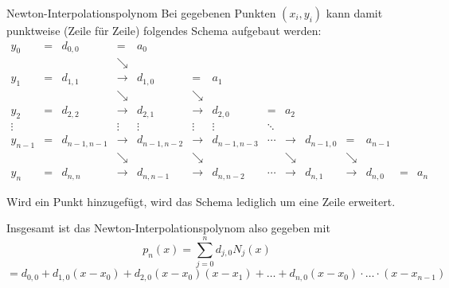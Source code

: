 \begin{defi}{Newton-Interpolationspolynom}
    Bei gegebenen Punkten $(x_i, y_i)$ kann damit punktweise (Zeile für Zeile) folgendes Schema aufgebaut werden:
    \[
        \begin{array}{cccccccccccccc}
            y_0     & = & d_{0,0}      & =           & a_0                                                                                                              \\
                    &   &              & \searrow                                                                                                                       \\
            y_1     & = & d_{1,1}      & \rightarrow & d_{1,0}      & =           & a_1                                                                                 \\
                    &   &              & \searrow    &              & \searrow                                                                                          \\
            y_2     & = & d_{2,2}      & \rightarrow & d_{2,1}      & \rightarrow & d_{2,0}      & =      & a_2                                                         \\
            \vdots  &   &              & \vdots      & \vdots       & \vdots      & \vdots       & \ddots                                                               \\
            y_{n-1} & = & d_{n-1, n-1} & \rightarrow & d_{n-1, n-2} & \rightarrow & d_{n-1, n-3} & \cdots & \rightarrow & d_{n-1, 0} & =           & a_{n-1}            \\
                    &   &              & \searrow    &              & \searrow    &              &        & \searrow    &            & \searrow                         \\
            y_n     & = & d_{n,n}      & \rightarrow & d_{n, n-1}   & \rightarrow & d_{n, n-2}   & \cdots & \rightarrow & d_{n, 1}   & \rightarrow & d_{n, 0} & = & a_n
        \end{array}
    \]
    
    Wird ein Punkt hinzugefügt, wird das Schema lediglich um eine Zeile erweitert.
    
    Insgesamt ist das Newton-Interpolationspolynom also gegeben mit 
    \[ 
        p_n(x) = \sum_{j=0}^{n} d_{j,0} N_j(x)  
    \]
    \[  
        = d_{0, 0} + d_{1, 0} (x - x_0) + d_{2, 0} (x - x_0) (x - x_1) + \ldots + d_{n, 0} (x - x_0) \cdot \ldots \cdot (x - x_{n-1})
    \]
\end{defi}

